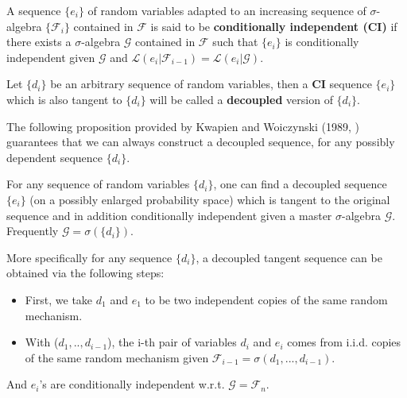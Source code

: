 \documentclass[ECP]{ejpecp} %
\newcommand{\F}{\mathcal{F}}
\newcommand{\G}{\mathcal{G}}
\begin{document}
\begin{definition}
    \label{def3 conditionally independent}
    A sequence $\{e_i\}$ of random variables adapted to an increasing sequence of $\sigma$-algebra $\{\F_i\}$ contained in $\F$ is said to be \textbf{conditionally independent (CI)} if there exists a $\sigma$-algebra $\mathcal{G}$ contained in $\F$ such that $\{e_i\}$ is conditionally independent given $\mathcal{G}$ and $\mathcal{L}(e_i|\F_{i-1}) =\mathcal{L}(e_i|\mathcal{G})$.
\end{definition}

\begin{definition}
    \label{def4 decoupled}
    Let $\{d_i\}$ be an arbitrary sequence of random variables, then a \textbf{ CI} sequence $\{e_i\}$ which is also tangent to $\{d_i\}$ will be called a \textbf{decoupled} version of $\{d_i\}$.
\end{definition}
The following proposition provided by Kwapien and Woiczynski (1989, \cite{MR1035249})
guarantees that we can always construct a decoupled sequence, for any possibly dependent sequence $\{d_i\}$.
\begin{proposition}
    For any sequence of random variables $\{d_i\}$, one can find a decoupled sequence $\{e_i\}$ (on a possibly enlarged probability space) which is tangent to the original sequence and in addition conditionally independent given a master $\sigma$-algebra $\mathcal{G}$. Frequently $\mathcal{G} = \sigma(\{d_i\})$.
\end{proposition}

More specifically for  any sequence $\{d_i\}$, a decoupled  tangent sequence can be obtained via the following steps:
\begin{itemize}
    \item First, we take $d_1$ and $e_1$ to be two independent copies of the same random mechanism. 
    \item With ($d_1,..,d_{i-1}$), the i-th pair of variables $d_i$ and $e_i$ comes from i.i.d. copies of the same random mechanism given $\F_{i-1} = \sigma (d_1,...,d_{i-1})$. 
\end{itemize}
And $e_i$’s are conditionally independent w.r.t. $\G = \F_n$.
\end{document}
